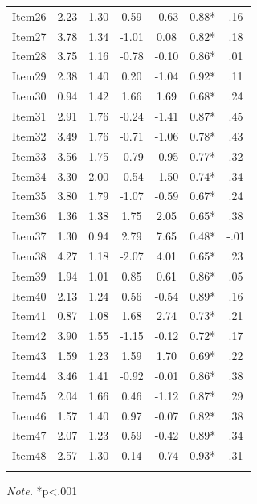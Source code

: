 \documentclass[
  english,
  man]{apa6}
\begin{document}
\begin{appendix}
\begin{table}[h]
\begin{center}
\begin{threeparttable}
\begin{tabular}{ccccccc}
Item26 & 2.23 & 1.30 & 0.59 & -0.63 & 0.88* & .16\\
Item27 & 3.78 & 1.34 & -1.01 & 0.08 & 0.82* & .18\\
Item28 & 3.75 & 1.16 & -0.78 & -0.10 & 0.86* & .01\\
Item29 & 2.38 & 1.40 & 0.20 & -1.04 & 0.92* & .11\\
Item30 & 0.94 & 1.42 & 1.66 & 1.69 & 0.68* & .24\\
Item31 & 2.91 & 1.76 & -0.24 & -1.41 & 0.87* & .45\\
Item32 & 3.49 & 1.76 & -0.71 & -1.06 & 0.78* & .43\\
Item33 & 3.56 & 1.75 & -0.79 & -0.95 & 0.77* & .32\\
Item34 & 3.30 & 2.00 & -0.54 & -1.50 & 0.74* & .34\\
Item35 & 3.80 & 1.79 & -1.07 & -0.59 & 0.67* & .24\\
Item36 & 1.36 & 1.38 & 1.75 & 2.05 & 0.65* & .38\\
Item37 & 1.30 & 0.94 & 2.79 & 7.65 & 0.48* & -.01\\
Item38 & 4.27 & 1.18 & -2.07 & 4.01 & 0.65* & .23\\
Item39 & 1.94 & 1.01 & 0.85 & 0.61 & 0.86* & .05\\
Item40 & 2.13 & 1.24 & 0.56 & -0.54 & 0.89* & .16\\
Item41 & 0.87 & 1.08 & 1.68 & 2.74 & 0.73* & .21\\
Item42 & 3.90 & 1.55 & -1.15 & -0.12 & 0.72* & .17\\
Item43 & 1.59 & 1.23 & 1.59 & 1.70 & 0.69* & .22\\
Item44 & 3.46 & 1.41 & -0.92 & -0.01 & 0.86* & .38\\
Item45 & 2.04 & 1.66 & 0.46 & -1.12 & 0.87* & .29\\
Item46 & 1.57 & 1.40 & 0.97 & -0.07 & 0.82* & .38\\
Item47 & 2.07 & 1.23 & 0.59 & -0.42 & 0.89* & .34\\
Item48 & 2.57 & 1.30 & 0.14 & -0.74 & 0.93* & .31\\
\bottomrule
\addlinespace
\end{tabular}

\begin{tablenotes}[para]
\normalsize{\textit{Note.} *p<.001}
\end{tablenotes}

\end{threeparttable}
\end{center}

\end{table}


\end{appendix}
\end{document}
